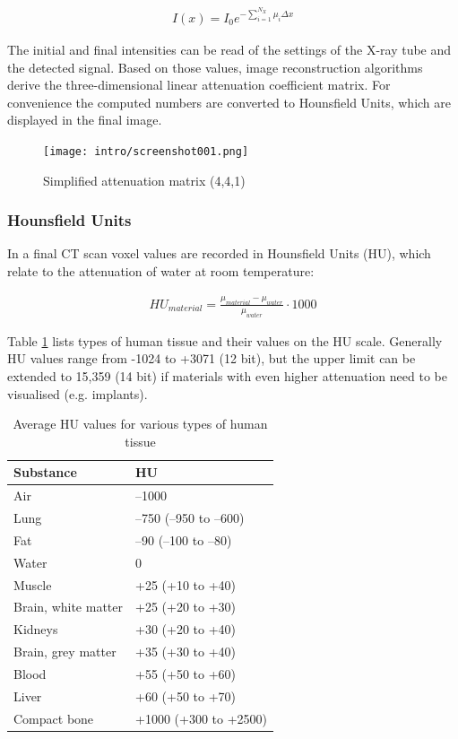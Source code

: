 \begin{align}
\label{eq:mu_sum}
I(x) = I_0 e^{- \sum\limits_{i=1}^{N_X} \mu_i \Delta x}
\end{align}

The initial and final intensities can be read of the settings of the X-ray tube and the detected signal.
Based on those values, image reconstruction algorithms derive the three-dimensional linear attenuation coefficient matrix.
For convenience the computed numbers are converted to Hounsfield Units, which are displayed in the final image. \cite{Podgorsak, Maidment2014}

\begin{figure}[!htb]
	\centering
	\texttt{[image: intro/screenshot001.png]}
	\caption{Simplified attenuation matrix (4,4,1)}
	\label{fig:voxel_matrix}
\end{figure}

\subsubsection{Hounsfield Units}

In a final CT scan voxel values are recorded in Hounsfield Units (HU), which relate to the attenuation of water at room temperature:

\begin{align}
HU_{material} = \frac{\mu_{material} - \mu_{water}}{\mu_{water}} \cdot 1000
\end{align}

Table \ref{tab:HU} lists types of human tissue and their values on the HU scale.
Generally HU values range from -1024 to +3071 (12 bit), but the upper limit can be extended to 15,359 (14 bit) if materials with even higher attenuation need to be visualised (e.g. implants).

\begin{table}[]
	\centering
	\caption{Average HU values for various types of human tissue}
	\label{tab:HU}
	\begin{tabular}{@{}ll@{}}
		\toprule
		Substance           & HU                     \\ \midrule
		Air                 & –1000                  \\
		Lung                & –750 (–950 to –600)    \\
		Fat                 & –90 (–100 to –80)      \\
		Water               & 0                      \\
		Muscle              & +25 (+10 to +40)       \\
		Brain, white matter & +25 (+20 to +30)       \\
		Kidneys             & +30 (+20 to +40)       \\
		Brain, grey matter  & +35 (+30 to +40)       \\
		Blood               & +55 (+50 to +60)       \\
		Liver               & +60 (+50 to +70)       \\
		Compact bone        & +1000 (+300 to +2500)  \\ \bottomrule
	\end{tabular}
\end{table}

